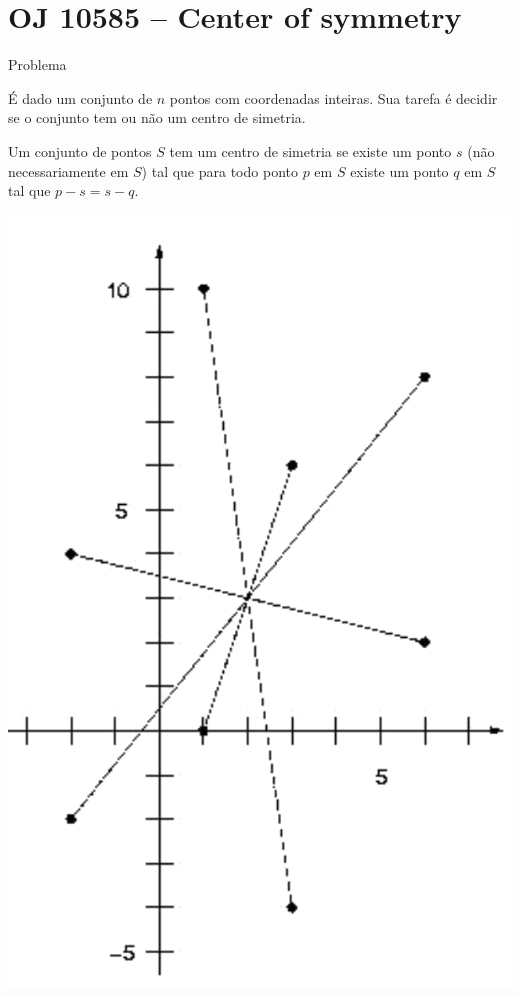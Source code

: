 \section{OJ 10585 -- Center of symmetry}

\begin{frame}[fragile]{Problema}

\begin{minipage}{0.6\textwidth}
É dado um conjunto de $n$ pontos com coordenadas inteiras. Sua tarefa é decidir se o conjunto tem 
ou não um centro de simetria. 

Um conjunto de pontos $S$ tem um centro de simetria se existe um ponto $s$ (não necessariamente em
$S$) tal que para todo ponto $p$ em $S$ existe um ponto $q$ em $S$ tal que $p - s = s - q$.
\end{minipage}
\begin{minipage}{0.35\textwidth}
\begin{center}
\includegraphics[scale=0.5]{figure.png}
\end{center}
\end{minipage}

\end{frame}

